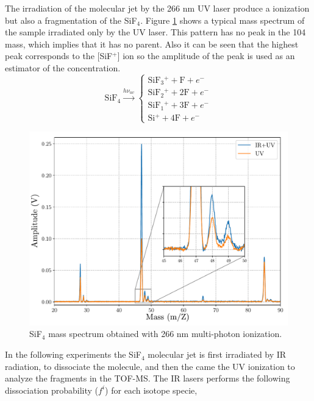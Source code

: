 \documentclass[global,twocolumn]{svjour}
\begin{document}
The irradiation of the molecular jet by the 266 nm UV laser produce a ionization but also a fragmentation of the SiF$_{4}$. Figure \ref{fig:spec_uv} shows a typical mass spectrum of the sample irradiated only by the UV laser. This pattern has no peak in the 104 mass, which implies that it has no parent. Also it can be seen that the highest peak corresponds to the [SiF$^{+}$] ion so the amplitude of the peak is used as an estimator of the concentration.     
\begin{equation}
\text{SiF$_{4}$} \xrightarrow{h \nu_{uv}}
\begin{cases}
\text{SiF$_{3}$$^{+}$} + \text{F} + e^{-} \\
\text{SiF$_{2}$$^{+}$} + \text{2F} + e^{-} \\
\text{SiF$_{1}$$^{+}$} + \text{3F} + e^{-} \\
\text{Si$^{+}$} + \text{4F} + e^{-}
\end{cases}
\end{equation}

\begin{figure}[h]
	\includegraphics[width =1\linewidth]{figures/sp_uv_ir.pdf}
	\caption{\label{fig:spec_uv} SiF$_{4}$ mass spectrum obtained with 266 nm multi-photon ionization.}
\end{figure}

In the following experiments the SiF$_{4}$ molecular jet is first irradiated by IR radiation, to dissociate the molecule, and then the came the UV ionization to analyze the fragments in the TOF-MS. The IR lasers performs the following dissociation probability ($f^{i}$) for each isotope specie,
\end{document}
